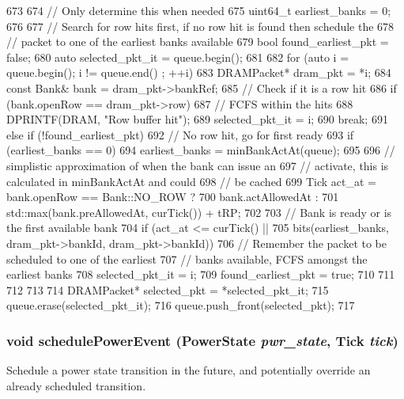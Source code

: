 \begin{DoxyCode}
673 {
674     // Only determine this when needed
675     uint64_t earliest_banks = 0;
676 
677     // Search for row hits first, if no row hit is found then schedule the
678     // packet to one of the earliest banks available
679     bool found_earliest_pkt = false;
680     auto selected_pkt_it = queue.begin();
681 
682     for (auto i = queue.begin(); i != queue.end() ; ++i) {
683         DRAMPacket* dram_pkt = *i;
684         const Bank& bank = dram_pkt->bankRef;
685         // Check if it is a row hit
686         if (bank.openRow == dram_pkt->row) {
687             // FCFS within the hits
688             DPRINTF(DRAM, "Row buffer hit\n");
689             selected_pkt_it = i;
690             break;
691         } else if (!found_earliest_pkt) {
692             // No row hit, go for first ready
693             if (earliest_banks == 0)
694                 earliest_banks = minBankActAt(queue);
695 
696             // simplistic approximation of when the bank can issue an
697             // activate, this is calculated in minBankActAt and could
698             // be cached
699             Tick act_at = bank.openRow == Bank::NO_ROW ?
700                 bank.actAllowedAt :
701                 std::max(bank.preAllowedAt, curTick()) + tRP;
702 
703             // Bank is ready or is the first available bank
704             if (act_at <= curTick() ||
705                 bits(earliest_banks, dram_pkt->bankId, dram_pkt->bankId)) {
706                 // Remember the packet to be scheduled to one of the earliest
707                 // banks available, FCFS amongst the earliest banks
708                 selected_pkt_it = i;
709                 found_earliest_pkt = true;
710             }
711         }
712     }
713 
714     DRAMPacket* selected_pkt = *selected_pkt_it;
715     queue.erase(selected_pkt_it);
716     queue.push_front(selected_pkt);
717 }
\end{DoxyCode}
\hypertarget{classDRAMCtrl_a233880f1f4b8f6455a2ff083dda871d3}{
\subsubsection[{schedulePowerEvent}]{\setlength{\rightskip}{0pt plus 5cm}void schedulePowerEvent ({\bf PowerState} {\em pwr\_\-state}, \/  {\bf Tick} {\em tick})}}
\label{classDRAMCtrl_a233880f1f4b8f6455a2ff083dda871d3}
Schedule a power state transition in the future, and potentially override an already scheduled transition.


